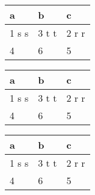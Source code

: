 \begin{center}
\begin{tabular}{l|l|l}
\textbf{a} & \textbf{b} & \textbf{c} \\
\hline
1 s s & 3 t t & 2 r r \\
4 & 6 & 5 \\
\end{tabular}
\end{center}

\begin{center}
\begin{tabular}{lll}
\textbf{a} & \textbf{b} & \textbf{c} \\
\hline
1 s s & 3 t t & 2 r r \\ \hline
4 & 6 & 5 \\
\end{tabular}
\end{center}

\begin{center}
\begin{tabular}{|lll|}
\hline
\textbf{a} & \textbf{b} & \textbf{c} \\
\hline
1 s s & 3 t t & 2 r r \\
4 & 6 & 5 \\
\hline
\end{tabular}
\end{center}

